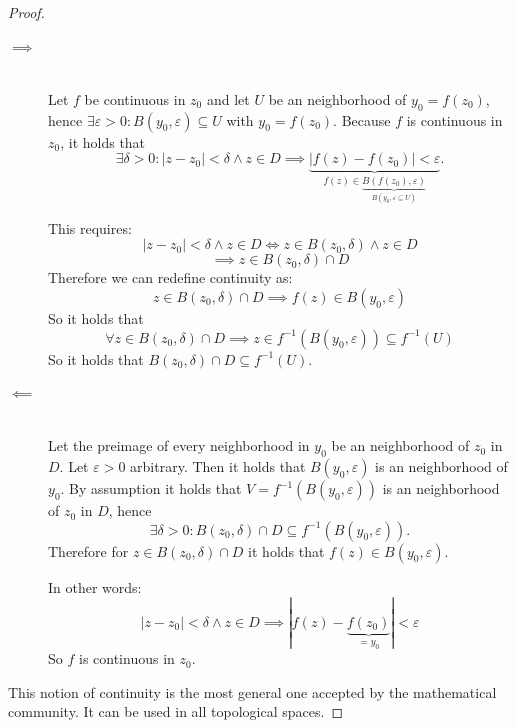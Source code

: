 \documentclass[a4paper,landscape,twocolumn]{article}
\theoremstyle{definition}
\newcommand\abs[1]{\left|#1\right|}
\begin{document}
\begin{proof}
  \begin{description}
    \item[$\implies$] \hfill{} \\
      Let $f$ be continuous in $z_0$ and let $U$ be an neighborhood
      of $y_0 = f(z_0)$, hence $\exists \varepsilon > 0: B(y_0, \varepsilon)
      \subseteq U$ with $y_0 = f(z_0)$. Because $f$ is continuous in $z_0$,
      it holds that
      \[
        \exists \delta > 0:
        \abs{z - z_0} < \delta \land z \in D \implies
        \underbrace{\abs{f(z) - f(z_0)} < \varepsilon}_{f(z) \in \underbrace{B(f(z_0), \varepsilon)}_{B(y_0, \varepsilon \subseteq U)}}.
      \]

      This requires:
      \[
        \abs{z - z_0} < \delta \land z \in D \iff z \in B(z_0, \delta) \land z \in D
      \]
      \[ \implies z \in B(z_0, \delta) \cap D \]
      Therefore we can redefine continuity as:
      \[ z \in B(z_0, \delta) \cap D \implies f(z) \in B(y_0, \varepsilon) \]
      So it holds that
      \[ \forall z \in B(z_0, \delta) \cap D \implies z \in f^{-1}(B(y_0, \varepsilon)) \subseteq f^{-1}(U) \]
      So it holds that $B(z_0, \delta) \cap D \subseteq f^{-1}(U)$.

    \item[$\impliedby$] \hfill{} \\
      Let the preimage of every neighborhood in $y_0$ be an neighborhood of $z_0$ in $D$.
      Let $\varepsilon > 0$ arbitrary. Then it holds that $B(y_0, \varepsilon)$ is an neighborhood of $y_0$.
      By assumption it holds that $V = f^{-1}(B(y_0, \varepsilon))$ is an neighborhood of $z_0$ in $D$,
      hence
      \[ \exists \delta > 0: B(z_0, \delta) \cap D \subseteq f^{-1}(B(y_0, \varepsilon)). \]
      Therefore for $z \in B(z_0, \delta) \cap D$ it holds that $f(z) \in B(y_0, \varepsilon)$.

      In other words:
      \[ \abs{z - z_0} < \delta \land z \in D \implies |f(z) - \underbrace{f(z_0)}_{= y_0}| < \varepsilon \]
      So $f$ is continuous in $z_0$.
  \end{description}
  This notion of continuity is the most general one accepted by the mathematical community.
  It can be used in all topological spaces.
\end{proof}
\end{document}
